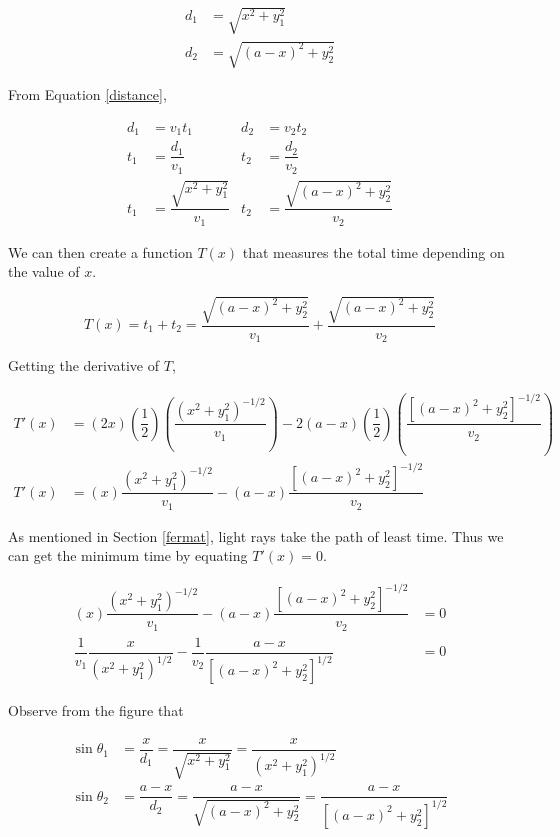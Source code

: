 \documentclass[a4paper,12pt]{article}
\begin{document}
\begin{align}
d_1 &= \sqrt{x^2 + y_1^2} \nonumber\\
d_2 &= \sqrt{(a-x)^2 +  y_2^2} \nonumber
\end{align}

From Equation \eqref{distance},

\begin{align}
d_1 &= v_1 t_1 & d_2 &= v_2 t_2 \nonumber\\
t_1 &= \dfrac{d_1}{v_1} & t_2 &= \dfrac{d_2}{v_2}\nonumber\\
t_1 &= \dfrac{\sqrt{x^2 + y_1^2}}{v_1} & t_2 &= \dfrac{\sqrt{(a-x)^2 + y_2^2}}{v_2}
\end{align}

We can then create a function $T(x)$ that measures the total time depending on the value of $x$.

\begin{equation}
T(x) = t_1 + t_2 =\dfrac{\sqrt{(a-x)^2 + y_2^2}}{v_1} + \dfrac{\sqrt{(a-x)^2 + y_2^2}}{v_2} 
\end{equation}

Getting the derivative of $T$,

\begin{align}
T'(x) &= (2x) \left( \dfrac{1}{2} \right) \left(\dfrac{(x^2 + y_1^2)^{-1/2}}{v_1} \right) - 2(a-x)\left( \dfrac{1}{2} \right) \left( \dfrac{[(a-x)^2+y_2^2]^{-1/2}}{v_2} \right) \nonumber\\
T'(x) &= (x) \dfrac{(x^2 + y_1^2)^{-1/2}}{v_1} - (a-x)\dfrac{[(a-x)^2+y_2^2]^{-1/2}}{v_2}
\end{align}

As mentioned in Section \ref{fermat}, light rays take the path of least time. Thus we can get the minimum time by equating $T'(x) = 0$.

\begin{align}
(x) \dfrac{(x^2 + y_1^2)^{-1/2}}{v_1} - (a-x)\dfrac{[(a-x)^2+y_2^2]^{-1/2}}{v_2} &= 0  \nonumber \\
\dfrac{1}{v_1} \dfrac{x}{(x^2 + y_1^2)^{1/2}}  -  \dfrac{1}{v_2} \dfrac{a-x}{[(a-x)^2 + y_2^2]^{1/2}}  &= 0 \label{badsnell}
\end{align}

Observe from the figure that

\begin{align}
\sin \theta_1 &= \dfrac{x}{d_1} = \dfrac{x}{\sqrt{x^2 + y_1^2}} =\dfrac{x}{(x^2 +y_1^2)^{1/2}} \\
\sin \theta_2 &= \dfrac{a-x}{d_2} = \dfrac{a-x}{\sqrt{(a-x)^2 + y_2^2}} = \dfrac{a-x}{[(a-x)^2 + y_2^2]^{1/2}} 
\end{align}
\end{document}
